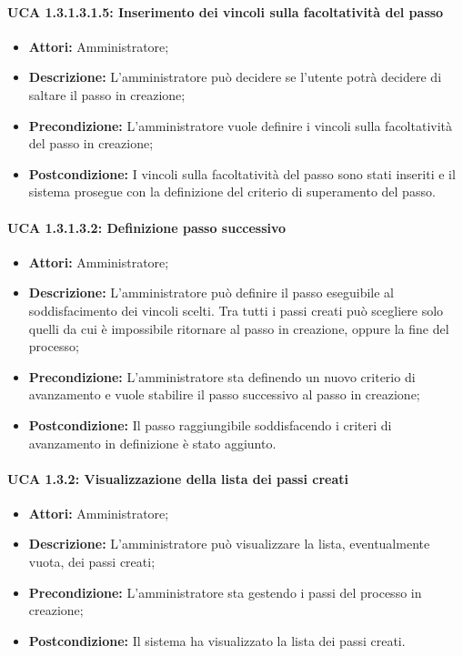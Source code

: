 \paragraph{UCA 1.3.1.3.1.5: Inserimento dei vincoli sulla facoltatività del passo}
\begin{itemize}
\item \textbf{Attori:}
 Amministratore;
\item \textbf{Descrizione:} 
L'amministratore può decidere se l'utente potrà decidere di saltare il passo in creazione;
\item \textbf{Precondizione:} 
L'amministratore vuole definire i vincoli sulla facoltatività del passo in creazione;
\item \textbf{Postcondizione:} 
I vincoli sulla facoltatività del passo sono stati inseriti e il sistema prosegue con la definizione del criterio di superamento del passo.
\end{itemize}

\paragraph{UCA 1.3.1.3.2: Definizione passo successivo}
\begin{itemize}
\item \textbf{Attori:}
 Amministratore;
\item \textbf{Descrizione:}
 L'amministratore può definire il passo eseguibile al soddisfacimento dei vincoli scelti. Tra tutti i passi creati può scegliere solo quelli da cui è impossibile ritornare al passo in creazione, oppure la fine del processo;
\item \textbf{Precondizione:} 
L'amministratore sta definendo un nuovo criterio di avanzamento e vuole stabilire il passo successivo al passo in creazione;
\item \textbf{Postcondizione:} 
Il passo raggiungibile soddisfacendo i criteri di avanzamento in definizione è stato aggiunto.
\end{itemize}

\paragraph{UCA 1.3.2: Visualizzazione della lista dei passi creati}
\begin{itemize}
\item \textbf{Attori:}
 Amministratore;
\item \textbf{Descrizione:}
 L'amministratore può visualizzare la lista, eventualmente vuota, dei passi creati;
\item \textbf{Precondizione:} 
L'amministratore sta gestendo i passi del processo in creazione;
\item \textbf{Postcondizione:} 
Il sistema ha visualizzato la lista dei passi creati.
\end{itemize}

